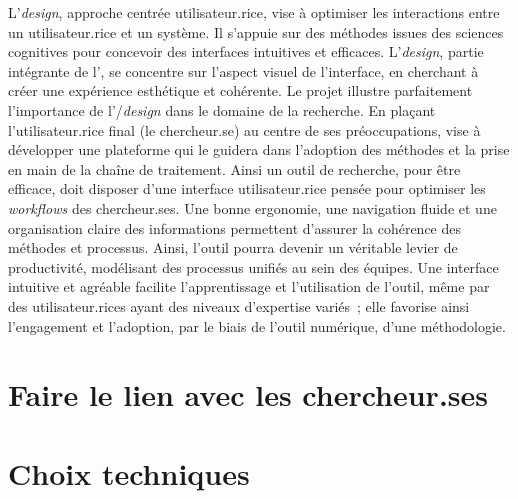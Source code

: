 L'\ux \textit{design}, approche centrée utilisateur.rice, vise à optimiser les
interactions entre un utilisateur.rice et un système. Il s'appuie sur des
méthodes issues des sciences cognitives pour concevoir des interfaces
intuitives et efficaces. L'\ui \textit{design}, partie intégrante de l'\ux,
se concentre sur l'aspect visuel de l'interface, en cherchant à créer
une expérience esthétique et cohérente. Le projet \eida illustre
parfaitement l'importance de l'\ux/\ui \textit{design} dans le domaine de la
recherche. En plaçant l'utilisateur.rice final (le chercheur.se) au centre de
ses préoccupations, \eida vise à développer une plateforme qui le guidera
dans l'adoption des méthodes et la prise en main de la chaîne de
traitement. Ainsi un outil de recherche, pour être efficace, doit
disposer d'une interface utilisateur.rice pensée pour optimiser les \textit{workflows}
des chercheur.ses. Une bonne ergonomie, une navigation fluide et une
organisation claire des informations permettent d'assurer la cohérence
des méthodes et processus. Ainsi, l'outil pourra devenir un véritable
levier de productivité, modélisant des
processus unifiés au sein des équipes. Une interface intuitive et
agréable facilite l'apprentissage et l'utilisation de l'outil, même par
des utilisateur.rices ayant des niveaux d'expertise variés~; elle favorise
ainsi l'engagement et l'adoption, par le biais de l'outil numérique, d'une
méthodologie.

\hypertarget{faire-le-lien-avec-les-chercheur.ses}{%
\section{Faire le lien avec les
chercheur.ses}\label{faire-le-lien-avec-les-chercheur.ses}}



\hypertarget{choix-techniques}{%
\section{Choix techniques}\label{choix-techniques}}



\vspace{2cm}

